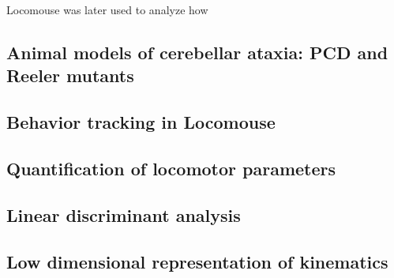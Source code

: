 Locomouse was later used to analyze how 

\subsection{Animal models of cerebellar ataxia: PCD and Reeler mutants} %
\subsection{Behavior tracking in Locomouse}
\subsection{Quantification of locomotor parameters} %
\subsection{Linear discriminant analysis} %





\subsection{Low dimensional representation of kinematics}

